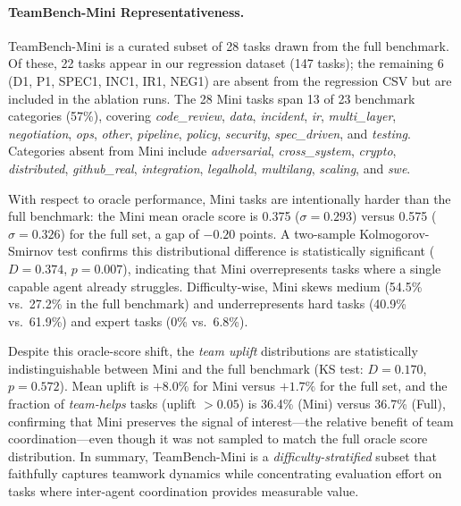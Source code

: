 \paragraph{TeamBench-Mini Representativeness.}
TeamBench-Mini is a curated subset of 28 tasks drawn from the full benchmark.
Of these, 22 tasks appear in our regression dataset (147 tasks); the remaining 6
(D1, P1, SPEC1, INC1, IR1, NEG1) are absent from the regression CSV but are
included in the ablation runs.
The 28 Mini tasks span 13 of 23 benchmark categories (57\%), covering
\textit{code\_review}, \textit{data}, \textit{incident}, \textit{ir},
\textit{multi\_layer}, \textit{negotiation}, \textit{ops}, \textit{other},
\textit{pipeline}, \textit{policy}, \textit{security}, \textit{spec\_driven},
and \textit{testing}.
Categories absent from Mini include \textit{adversarial}, \textit{cross\_system},
\textit{crypto}, \textit{distributed}, \textit{github\_real}, \textit{integration},
\textit{legalhold}, \textit{multilang}, \textit{scaling}, and \textit{swe}.

With respect to oracle performance, Mini tasks are intentionally harder than the
full benchmark: the Mini mean oracle score is 0.375 ($\sigma=0.293$) versus
0.575 ($\sigma=0.326$) for the full set, a gap of $-0.20$ points.
A two-sample Kolmogorov-Smirnov test confirms this distributional difference
is statistically significant ($D=0.374$, $p=0.007$), indicating that Mini
overrepresents tasks where a single capable agent already struggles.
Difficulty-wise, Mini skews medium (54.5\% vs.\ 27.2\% in the full benchmark)
and underrepresents hard tasks (40.9\% vs.\ 61.9\%) and expert tasks (0\% vs.\ 6.8\%).

Despite this oracle-score shift, the \emph{team uplift} distributions are
statistically indistinguishable between Mini and the full benchmark
(KS test: $D=0.170$, $p=0.572$).
Mean uplift is $+8.0\%$ for Mini versus $+1.7\%$ for the full set,
and the fraction of \textit{team-helps} tasks (uplift $>0.05$) is
36.4\% (Mini) versus 36.7\% (Full), confirming that Mini preserves
the signal of interest---the relative benefit of team coordination---even
though it was not sampled to match the full oracle score distribution.
In summary, TeamBench-Mini is a \emph{difficulty-stratified} subset that
faithfully captures teamwork dynamics while concentrating evaluation effort
on tasks where inter-agent coordination provides measurable value.

